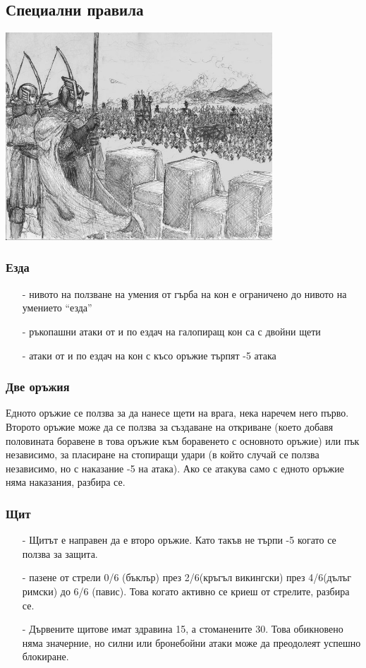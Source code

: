 \subsection{Специални правила}
\begin{center}
\includegraphics[width=0.75\textwidth]{../images/siege}~
\\[1cm]
\end{center}

\subsubsection{Езда}
\begin{itemize}
\item[-]{нивото на ползване на умения от гърба на кон е ограничено до нивото на умението “езда”}
\item[-]{ръкопашни атаки от и по ездач на галопиращ кон са с двойни щети}
\item[-]{атаки от и по ездач на кон с късо оръжие търпят -5 атака}
\end{itemize}

\subsubsection{Две оръжия}
Едното оръжие се ползва за да нанесе щети на врага, нека наречем него първо.
Второто оръжие може да се ползва за създаване на откриване (което добавя половината боравене в това оръжие към боравенето с основното оръжие) или пък независимо, за пласиране на стопиращи удари (в който случай се ползва независимо, но с наказание -5 на атака).
Ако се атакува само с едното оръжие няма наказания, разбира се.

\subsubsection{Щит}
\begin{itemize}
\item[-]{Щитът е направен да е второ оръжие. Като такъв не търпи -5 когато се ползва за защита.}
\item[-]{пазене от стрели 0/6 (бъклър) през 2/6(кръгъл викингски) през 4/6(дълъг римски) до 6/6 (павис). Това когато активно се криеш от стрелите, разбира се.}
\item[-]{Дървените щитове имат здравина 15, а стоманените 30. Това обикновено няма значерние, но силни или бронебойни атаки може да преодолеят успешно блокиране.}
\end{itemize}

